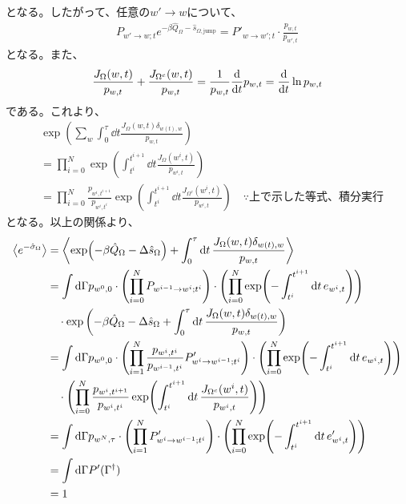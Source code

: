 \documentclass[a4paper,11pt]{jsarticle}
\numberwithin{equation}{section}
\begin{document}
となる。したがって、任意の$w' \to w$について、
\begin{align}
    P_{w' \to w; t} e^{-\beta \hat{Q}_{\Omega}-\hat{s}_{\Omega, \text{jump}}} = P'_{w \to w'; t} \cdot \frac{p_{w,t}}{p_{w',t}}
\end{align}
となる。また、
\begin{align}
    \frac{J_{\Omega}(w,t)}{p_{w,t}} + \frac{J_{\Omega^c}(w,t)}{p_{w,t}} = \frac{1}{p_{w,t}} \dv{t} p_{w,t} = \dv{t} \ln p_{w,t}
\end{align}
である。これより、
\begin{align}
    &\exp(\sum_{w }\int_{0}^{\tau} \dd{t} \frac{J_{\Omega}(w,t)\delta_{w(t), w}}{p_{w,t}}) \\
    &= \prod_{i=0}^{N} \exp(\int_{t^i}^{t^{i+1}} \dd{t} \frac{J_{\Omega}(w^{i},t)}{p_{w^{i},t}}) \\
    &= \prod_{i=0}^{N} \frac{p_{w^{i},t^{i+1}}}{p_{w^{i},t^{i}}} \exp(\int_{t^i}^{t^{i+1}} \dd{t} \frac{J_{\Omega^c}(w^{i},t)}{p_{w^{i},t}}) \quad \because \text{上で示した等式、積分実行} 
\end{align}
となる。以上の関係より、
\begin{align}
    \ev{e^{-\hat{\sigma}_\Omega}} &= \ev{\exp(-\beta \hat{Q}_\Omega - \Delta \hat{s}_\Omega) + \int_{0}^{\tau} \dd{t} \frac{J_{\Omega}(w,t)\delta_{w(t), w}}{p_{w,t}}} \\
    &= \int \dd \Gamma p_{w^{0},0} \cdot \left(\prod_{i=0}^{N} P_{w^{i-1} \to w^{i}; t^i} \right) \cdot \left(\prod_{i=0}^{N} \exp(-\int_{t^i}^{t^{i+1}} \dd{t} e_{w^{i},t}) \right) \\
    &\quad \cdot \exp\left(-\beta \hat{Q}_\Omega - \Delta \hat{s}_\Omega + \int_{0}^{\tau} \dd{t} \frac{J_{\Omega}(w,t)\delta_{w(t), w}}{p_{w,t}} \right) \\
    &= \int \dd \Gamma p_{w^{0},0} \cdot \left(\prod_{i=1}^{N} \frac{p_{w^{i},t^{i}}}{p_{w^{i-1},t^{i}}} P'_{w^{i} \to w^{i-1}; t^i} \right) \cdot \left(\prod_{i=0}^{N} \exp(-\int_{t^i}^{t^{i+1}} \dd{t} e_{w^{i},t}) \right) \\
    &\quad \cdot \left(\prod_{i=0}^{N} \frac{p_{w^{i},t^{i+1}}}{p_{w^{i},t^{i}}} \exp(\int_{t^i}^{t^{i+1}} \dd{t} \frac{J_{\Omega^c}(w^{i},t)}{p_{w^{i},t}}) \right) \\
    &= \int \dd \Gamma p_{w^{N},\tau} \cdot \left(\prod_{i=1}^{N} P'_{w^{i} \to w^{i-1}; t^i} \right) \cdot \left(\prod_{i=0}^{N} \exp(-\int_{t^i}^{t^{i+1}} \dd{t} e'_{w^{i},t}) \right) \\
    &=\int \dd \Gamma P'(\Gamma^{\dagger})\\
    &= 1
\end{align}
\end{document}
